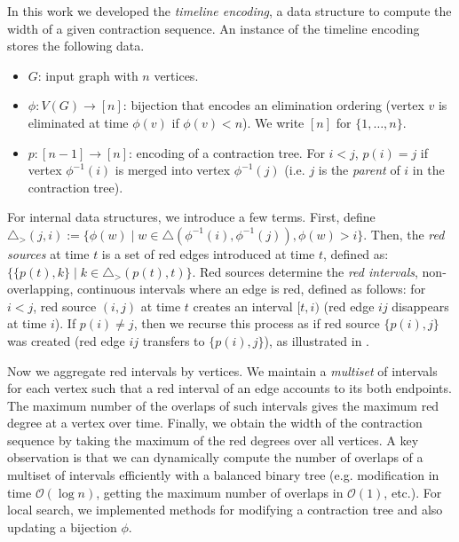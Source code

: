 \documentclass[a4paper,UKenglish,cleveref, autoref, thm-restate]{lipics-v2021}
\begin{document}
In this work we developed the \emph{timeline encoding}, a data structure to 
compute the width of a given contraction sequence.
An instance of the timeline encoding stores the following data.

\begin{itemize}
    \item $G$: input graph with $n$ vertices.
    \item $\phi: V(G) \to [n]$: bijection that encodes an elimination ordering
    (vertex $v$ is eliminated at time $\phi(v)$ if $\phi(v)<n$).
    We write $[n]$ for $\{1,\ldots,n\}$.
    \item $p: [n - 1] \to [n]$: encoding of a contraction tree.
    For $i<j$, $p(i)=j$ if vertex $\phi^{-1}(i)$ is merged into vertex $\phi^{-1}(j)$
    (i.e. $j$ is the \emph{parent} of $i$ in the contraction tree).
\end{itemize}

For internal data structures, we introduce a few terms.
%
First, define $\triangle_{>}(j,i)
:= \{\phi(w) \mid w \in \triangle(\phi^{-1}(i), \phi^{-1}(j)), \phi(w) > i\}$.
%
Then, the \emph{red sources} at time $t$ is a set of red edges
introduced at time $t$, defined as:
$\{\{p(t), k\} \mid k \in \triangle_{>}(p(t), t)\}$.
%
Red sources determine the \emph{red intervals},
non-overlapping, continuous intervals where an edge is red, defined as follows:
%
for $i<j$, red source $(i, j)$ at time $t$ creates an interval $[t,i)$
(red edge $ij$ disappears at time $i$).
If $p(i) \neq j$, then we recurse this process as if red source $\{p(i), j\}$ was created
(red edge $ij$ transfers to $\{p(i),j\}$),
as illustrated in .

Now we aggregate red intervals by vertices.
%
We maintain a \emph{multiset} of intervals for each vertex
such that a red interval of an edge accounts to its both endpoints.
%
The maximum number of the overlaps of such intervals gives
the maximum red degree at a vertex over time.
%
Finally, we obtain the width of the contraction sequence by
taking the maximum of the red degrees over all vertices.
%
A key observation is that we can dynamically compute the number of overlaps of a multiset of
intervals efficiently with a balanced binary tree
(e.g. modification in time $\mathcal{O}(\log n)$,
getting the maximum number of overlaps in $\mathcal{O}(1)$, etc.).
%
For local search, we implemented methods for modifying a contraction tree
and also updating a bijection $\phi$.
\end{document}

